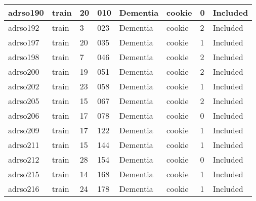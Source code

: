 \begin{center}
\begin{longtable}{|l|l|l|l|l|l|l|l|}
adrso190       & train                 & 20              & 010                & Dementia             & cookie          & 0                & Included      \\ \hline
adrso192       & train                 & 3               & 023                & Dementia             & cookie          & 2                & Included      \\ \hline
adrso197       & train                 & 20              & 035                & Dementia             & cookie          & 1                & Included      \\ \hline
adrso198       & train                 & 7               & 046                & Dementia             & cookie          & 2                & Included      \\ \hline
adrso200       & train                 & 19              & 051                & Dementia             & cookie          & 2                & Included      \\ \hline
adrso202       & train                 & 23              & 058                & Dementia             & cookie          & 1                & Included      \\ \hline
adrso205       & train                 & 15              & 067                & Dementia             & cookie          & 2                & Included      \\ \hline
adrso206       & train                 & 17              & 078                & Dementia             & cookie          & 0                & Included      \\ \hline
adrso209       & train                 & 17              & 122                & Dementia             & cookie          & 1                & Included      \\ \hline
adrso211       & train                 & 15              & 144                & Dementia             & cookie          & 1                & Included      \\ \hline
adrso212       & train                 & 28              & 154                & Dementia             & cookie          & 0                & Included      \\ \hline
adrso215       & train                 & 14              & 168                & Dementia             & cookie          & 1                & Included      \\ \hline
adrso216       & train                 & 24              & 178                & Dementia             & cookie          & 1                & Included      \\ \hline

\end{longtable}
\end{center}

